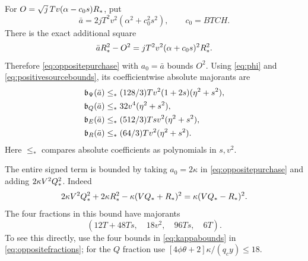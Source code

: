 For $O=\sqrt{j}\,Tv(\alpha-c_0s)R_*$, put
\[
 \bar a=2jT^2v^2(\alpha^2+c_0^2s^2),\qquad c_0=BTCH.
\]
There is the exact additional square
\[
 \bar aR_*^2-O^2=jT^2v^2(\alpha+c_0s)^2R_*^2 .
\]
Therefore \eqref{eq:oppositepurchase} with $a_0=\bar a$ bounds $O^2$.
Using \eqref{eq:phi} and \eqref{eq:positivesourcebounds},
its coefficientwise absolute majorants are
\begin{equation}
 \begin{split}
 \mathfrak b_\Psi(\bar a)&\leq_*
             (128/3)Tv^2(1+2s)(\eta^2+s^2),\\
 \mathfrak b_Q(\bar a)&\leq_*32v^4(\eta^2+s^2),\\
 \mathfrak b_E(\bar a)&\leq_*(512/3)Tsv^2(\eta^2+s^2),\\
 \mathfrak b_R(\bar a)&\leq_*(64/3)Tv^2(\eta^2+s^2).
 \end{split}\label{eq:Omajorants}
\end{equation}
Here $\leq_*$ compares absolute coefficients as polynomials in $s,v^2$.

The entire signed term is bounded by taking $a_0=2\kappa$ in
\eqref{eq:oppositepurchase} and adding $2\kappa V^2Q_*^2$.
Indeed
\[
 2\kappa V^2Q_*^2+2\kappa R_*^2
   -\kappa(VQ_*+R_*)^2=\kappa(VQ_*-R_*)^2 .
\]
The four fractions in this bound have majorants
\begin{equation}
 (12T+48Ts,\quad18v^2,\quad96Ts,\quad6T).
 \label{eq:signedmajorants}
\end{equation}
To see this directly, use the four bounds in \eqref{eq:kappabounds}
in \eqref{eq:oppositefractions}; for the $Q$ fraction use
$[4\phi\theta+2]\kappa/(q_cy)\leq18$.

